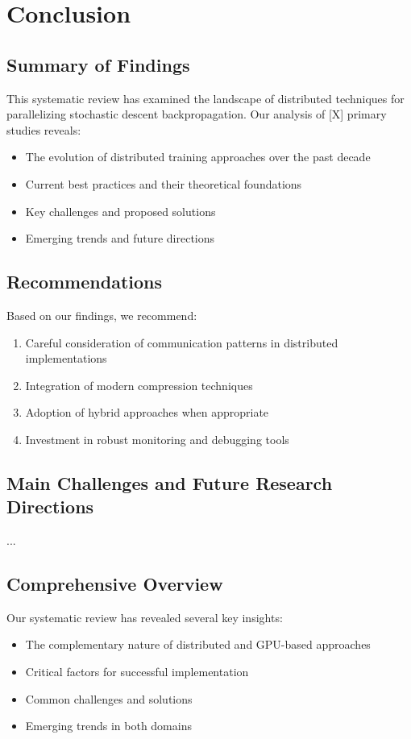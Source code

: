 \section{Conclusion}
\label{sec:conclusion}

\subsection{Summary of Findings}
This systematic review has examined the landscape of distributed techniques for parallelizing stochastic descent backpropagation. Our analysis of [X] primary studies reveals:
\begin{itemize}
    \item The evolution of distributed training approaches over the past decade
    \item Current best practices and their theoretical foundations
    \item Key challenges and proposed solutions
    \item Emerging trends and future directions
\end{itemize}

\subsection{Recommendations}
Based on our findings, we recommend:
\begin{enumerate}
    \item Careful consideration of communication patterns in distributed implementations
    \item Integration of modern compression techniques
    \item Adoption of hybrid approaches when appropriate
    \item Investment in robust monitoring and debugging tools
\end{enumerate}

\subsection{Main Challenges and Future Research Directions}
...


\subsection{Comprehensive Overview}
Our systematic review has revealed several key insights:
\begin{itemize}
    \item The complementary nature of distributed and GPU-based approaches
    \item Critical factors for successful implementation
    \item Common challenges and solutions
    \item Emerging trends in both domains
\end{itemize}

